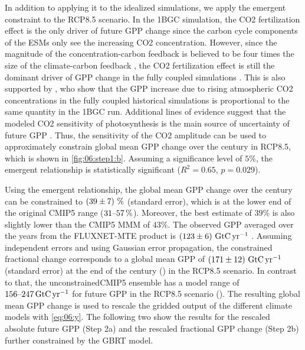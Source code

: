 In addition to applying it to the idealized simulations, we apply the emergent
constraint to the \acs{RCP}8.5 scenario. In the \ac{1BGC} simulation, the
\ac{CO2} fertilization effect is the only driver of future \ac{GPP} change
since the carbon cycle components of the \acp{ESM} only see the increasing
\ac{CO2} concentration. However, since the magnitude of the
concentration-carbon feedback is believed to be four times the size of the
climate-carbon feedback \autocite{Gregory2009}, the \ac{CO2} fertilization
effect is still the dominant driver of \ac{GPP} change in the fully coupled
simulations \autocite{Huntzinger2017}. This is also supported by
\textcite{Wenzel2016}, who show that the \ac{GPP} increase due to rising
atmospheric \ac{CO2} concentrations in the fully coupled historical simulations
is proportional to the same quantity in the \ac{1BGC} run. Additional lines of
evidence suggest that the modeled \ac{CO2} sensitivity of photosynthesis is the
main source of uncertainty of future \ac{GPP} \autocite{Arora2013, Haverd2020,
  Rogers2017}. Thus, the sensitivity of the \ac{CO2} amplitude can be used to
approximately constrain global mean \ac{GPP} change over the  century
in \acs{RCP}8.5, which is shown in \cref{fig:06:step1:b}. Assuming a
significance level of $5 \unit{\%}$, the emergent relationship is statistically
significant ($R^2 = 0.65$, $p = 0.029$).

Using the emergent relationship, the global mean \ac{GPP} change over the
 century can be constrained to $\pmrangeunit{39}{7}{\%}$ (standard
error), which is at the lower end of the original \acs{CMIP}5 range
($\rangeunit{31}{57}{\%}$). Moreover, the best estimate of $39 \unit{\%}$ is
also slightly lower than the \acs{CMIP}5 \ac{MMM} of $43 \unit{\%}$. The
observed \ac{GPP} averaged over the years  from the
FLUXNET-MTE product is $\pmrangeunit{123}{6}{\GtCyr{}}$ \autocite{Jung2011}.
Assuming independent errors and using Gaussian error propagation, the
constrained fractional change corresponds to a global mean \ac{GPP} of
$\pmrangeunit{171}{12}{\GtCyr{}}$ (standard error) at the end of the 
century () in the \acs{RCP}8.5 scenario. In contrast to that,
the unconstrained\acs{CMIP}5 ensemble has a model range of
$\rangeunit{156}{247}{\GtCyr{}}$ for future \ac{GPP} in the \acs{RCP}8.5
scenario (). The resulting global mean \ac{GPP} change is
used to rescale the gridded output of the different climate models with
\cref{eq:06:y}. The following two  show
the results for the rescaled absolute future \ac{GPP} (Step 2a) and the
rescaled fractional \ac{GPP} change (Step 2b) further constrained by the
\ac{GBRT} model.


